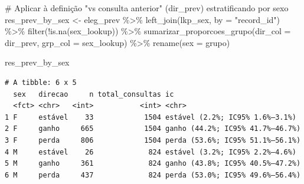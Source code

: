 \documentclass[
]{article}
\newenvironment{Shaded}{\begin{snugshade}}{\end{snugshade}}
\newcommand{\AttributeTok}[1]{\textcolor[rgb]{0.40,0.45,0.13}{#1}}
\newcommand{\CommentTok}[1]{\textcolor[rgb]{0.37,0.37,0.37}{#1}}
\newcommand{\FunctionTok}[1]{\textcolor[rgb]{0.28,0.35,0.67}{#1}}
\newcommand{\NormalTok}[1]{\textcolor[rgb]{0.00,0.23,0.31}{#1}}
\newcommand{\OtherTok}[1]{\textcolor[rgb]{0.00,0.23,0.31}{#1}}
\newcommand{\SpecialCharTok}[1]{\textcolor[rgb]{0.37,0.37,0.37}{#1}}
\newcommand{\StringTok}[1]{\textcolor[rgb]{0.13,0.47,0.30}{#1}}
\begin{document}
\begin{Shaded}
\begin{Highlighting}[]
\CommentTok{\# Aplicar à definição "vs consulta anterior" (dir\_prev) estratificando por sexo}
\NormalTok{res\_prev\_by\_sex }\OtherTok{\textless{}{-}}\NormalTok{ eleg\_prev }\SpecialCharTok{\%\textgreater{}\%}
  \FunctionTok{left\_join}\NormalTok{(lkp\_sex, }\AttributeTok{by =} \StringTok{"record\_id"}\NormalTok{) }\SpecialCharTok{\%\textgreater{}\%}
  \FunctionTok{filter}\NormalTok{(}\SpecialCharTok{!}\FunctionTok{is.na}\NormalTok{(sex\_lookup)) }\SpecialCharTok{\%\textgreater{}\%}
  \FunctionTok{sumarizar\_proporcoes\_grupo}\NormalTok{(}\AttributeTok{dir\_col =}\NormalTok{ dir\_prev, }\AttributeTok{grp\_col =}\NormalTok{ sex\_lookup) }\SpecialCharTok{\%\textgreater{}\%}
  \FunctionTok{rename}\NormalTok{(}\AttributeTok{sex =}\NormalTok{ grupo)}

\NormalTok{res\_prev\_by\_sex}
\end{Highlighting}
\end{Shaded}

\begin{verbatim}
# A tibble: 6 x 5
  sex   direcao     n total_consultas ic                              
  <fct> <chr>   <int>           <int> <chr>                           
1 F     estável    33            1504 estável (2.2%; IC95% 1.6%–3.1%) 
2 F     ganho     665            1504 ganho (44.2%; IC95% 41.7%–46.7%)
3 F     perda     806            1504 perda (53.6%; IC95% 51.1%–56.1%)
4 M     estável    26             824 estável (3.2%; IC95% 2.2%–4.6%) 
5 M     ganho     361             824 ganho (43.8%; IC95% 40.5%–47.2%)
6 M     perda     437             824 perda (53.0%; IC95% 49.6%–56.4%)
\end{verbatim}
\end{document}
